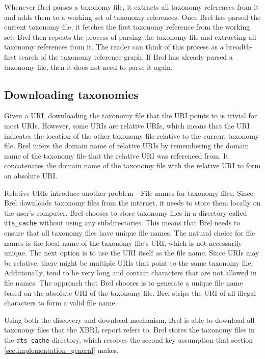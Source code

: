 Whenever Brel parses a taxonomy file, it extracts all taxonomy references from it and adds them to a working set of taxonomy references.
Once Brel has parsed the current taxonomy file, it fetches the first taxonomy reference from the working set.
Brel then repeats the process of parsing the taxonomy file and extracting all taxonomy references from it.
The reader can think of this process as a breadth-first search of the taxonomy reference graph.
If Brel has already parsed a taxonomy file, then it does not need to parse it again.

\subsection{Downloading taxonomies}

Given a URI, downloading the taxonomy file that the URI points to is trivial for most URIs.
However, some URIs are relative URIs, 
which means that the URI indicates the location of the other taxonomy file relative to the current taxonomy file\cite{w3_relative_uri}.
Brel infers the domain name of relative URIs by remembering the domain name of the taxonomy file that the relative URI was referenced from.
It concatenates the domain name of the taxonomy file with the relative URI to form an absolute URI.

Relative URIs introduce another problem - File names for taxonomy files.
Since Brel downloads taxonomy files from the internet, it needs to store them locally on the user's computer.
Brel chooses to store taxonomy files in a directory called \texttt{dts\_cache} without using any subdirectories.
This means that Brel needs to ensure that all taxonomy files have unique file names.
The natural choice for file names is the local name of the taxonomy file's URI, which is not necessarily unique.
The next option is to use the URI itself as the file name. 
Since URIs may be relative, there might be multiple URIs that point to the same taxonomy file.
Additionally, tend to be very long and contain characters that are not allowed in file names.
The approach that Brel chooses is to generate a unique file name based on the absolute URI of the taxonomy file.
Brel strips the URI of all illegal characters to form a valid file name.

Using both the discovery and download mechanism, Brel is able to download all taxonomy files that the XBRL report refers to.
Brel stores the taxonomy files in the \texttt{dts\_cache} directory, 
which resolves the second key assumption that section \ref{sec:implementation_general} makes.
